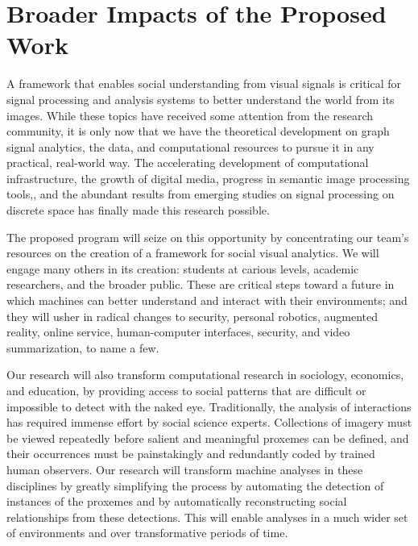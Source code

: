 \vspace{-8pt}
\section{Broader Impacts of the Proposed Work}
\label{sec:impacts}
\vspace{-8pt}
A framework that enables social understanding from visual signals is critical for signal processing and analysis systems to better understand the world from its images. While these topics have received some attention from the research community, it is only now that we have the theoretical development on graph signal analytics, the data, and computational resources to pursue it in any practical, real-world way. The accelerating development of computational infrastructure, the growth of digital media, progress in semantic image processing tools,, and the abundant results from emerging studies on signal processing on discrete space has finally made this research possible.

The proposed program will seize on this opportunity by concentrating our team's resources on the creation of a framework for social visual analytics. We will engage many others in its creation: students at carious levels, academic researchers, and the broader public. These are critical steps toward a future in which machines can better understand and interact with their environments; and they will usher in radical changes to security, personal robotics, augmented reality, online service, human-computer interfaces, security, and video summarization, to name a few.

Our research will also transform computational research in sociology, economics, and education, by providing access to social patterns that are difficult or impossible to detect with the naked eye. Traditionally, the analysis of interactions has required immense effort by social science experts. Collections of imagery must be viewed repeatedly before salient and meaningful proxemes can be defined, and their occurrences must be painstakingly and redundantly coded by trained human observers. Our research will transform machine analyses in these disciplines by greatly simplifying the process by automating the detection of instances of the proxemes and by automatically reconstructing social relationships from these detections. This will enable analyses in a much wider set of environments and over transformative periods of time.

